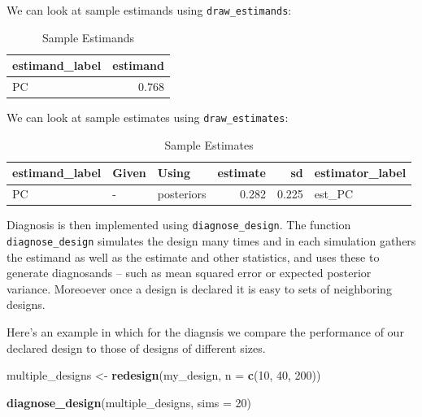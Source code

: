 \documentclass[
  12pt,
]{book}
\newenvironment{Shaded}{\begin{snugshade}}{\end{snugshade}}
\newcommand{\DataTypeTok}[1]{\textcolor[rgb]{0.13,0.29,0.53}{#1}}
\newcommand{\DecValTok}[1]{\textcolor[rgb]{0.00,0.00,0.81}{#1}}
\newcommand{\KeywordTok}[1]{\textcolor[rgb]{0.13,0.29,0.53}{\textbf{#1}}}
\newcommand{\NormalTok}[1]{#1}
\newcommand{\StringTok}[1]{\textcolor[rgb]{0.31,0.60,0.02}{#1}}
\begin{document}
We can look at sample estimands using \texttt{draw\_estimands}:

\begin{table}

\caption{\label{tab:estimands}Sample Estimands}
\centering
\begin{tabular}[t]{l|r}
\hline
estimand\_label & estimand\\
\hline
PC & 0.768\\
\hline
\end{tabular}
\end{table}

We can look at sample estimates using \texttt{draw\_estimates}:

\begin{table}

\caption{\label{tab:estimates}Sample Estimates}
\centering
\begin{tabular}[t]{l|l|l|r|r|l}
\hline
estimand\_label & Given & Using & estimate & sd & estimator\_label\\
\hline
PC & - & posteriors & 0.282 & 0.225 & est\_PC\\
\hline
\end{tabular}
\end{table}

Diagnosis is then implemented using \texttt{diagnose\_design}. The function \texttt{diagnose\_design} simulates the design many times and in each simulation gathers the estimand as well as the estimate and other statistics, and uses these to generate diagnosands -- such as mean squared error or expected posterior variance. Moreoever once a design is declared it is easy to sets of neighboring designs.

Here's an example in which for the diagnsis we compare the performance of our declared design to those of designs of different sizes.

\begin{Shaded}
\begin{Highlighting}[]
\NormalTok{multiple_designs <-}\StringTok{ }\KeywordTok{redesign}\NormalTok{(my_design, }\DataTypeTok{n =} \KeywordTok{c}\NormalTok{(}\DecValTok{10}\NormalTok{, }\DecValTok{40}\NormalTok{, }\DecValTok{200}\NormalTok{))}

\KeywordTok{diagnose_design}\NormalTok{(multiple_designs, }\DataTypeTok{sims =} \DecValTok{20}\NormalTok{)}
\end{Highlighting}
\end{Shaded}
\end{document}
